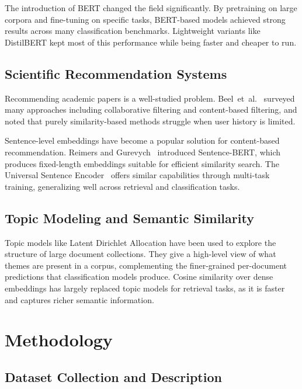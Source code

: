\documentclass[conference]{IEEEtran}
\begin{document}
The introduction of BERT \cite{devlin2018bert} changed the field
significantly.  By pretraining on large corpora and fine-tuning on
specific tasks, BERT-based models achieved strong results across many
classification benchmarks.  Lightweight variants like DistilBERT
kept most of this performance while being faster and cheaper to run.

\subsection{Scientific Recommendation Systems}

Recommending academic papers is a well-studied problem.
Beel~et~al.~\cite{beel2016paper} surveyed many approaches including
collaborative filtering and content-based filtering, and noted that
purely similarity-based methods struggle when user history is limited.

Sentence-level embeddings have become a popular solution for
content-based recommendation.  Reimers and
Gurevych~\cite{reimers2019sentence} introduced Sentence-BERT, which
produces fixed-length embeddings suitable for efficient similarity
search.  The Universal Sentence Encoder~\cite{cer2018universal}
offers similar capabilities through multi-task training, generalizing
well across retrieval and classification tasks.

\subsection{Topic Modeling and Semantic Similarity}

Topic models like Latent Dirichlet Allocation
\cite{blei2003latent} have been used to explore the structure of
large document collections.  They give a high-level view of what
themes are present in a corpus, complementing the finer-grained
per-document predictions that classification models produce.
Cosine similarity over dense embeddings has largely replaced
topic models for retrieval tasks, as it is faster and captures
richer semantic information.

\section{Methodology}
\label{sec:method}

\subsection{Dataset Collection and Description}
\end{document}
